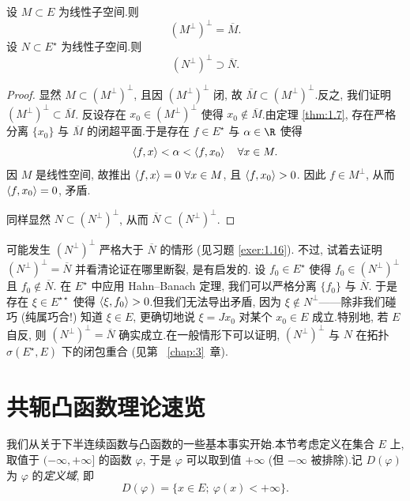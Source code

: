\begin{proposition}
\label{prop:1.9}
设 $M\subset E$ 为线性子空间.则
\begin{equation*}
(M^\perp)^\perp=\overline{M}.
\end{equation*}
设 $N\subset E^\star$ 为线性子空间.则
\begin{equation*}
(N^\perp)^\perp\supset\overline{N}.
\end{equation*}
\end{proposition}

\begin{proof}
显然 $M\subset(M^\perp)^\perp$, 且因 $(M^\perp)^\perp$ 闭, 故
$\overline{M}\subset(M^\perp)^\perp$.反之, 我们证明 $(M^\perp)^\perp\subset\overline{M}$.
反设存在 $x_0\in(M^\perp)^\perp$ 使得 $x_0\notin\overline{M}$.由定理  \ref{thm:1.7},
存在严格分离 $\{x_0\}$ 与 $\overline{M}$ 的闭超平面.于是存在 $f\in E^\star$ 与
$\alpha\in\R$ 使得
\begin{equation*}
\left\langle f,x\right\rangle<\alpha<\left\langle f,x_0\right\rangle\quad \forall x\in M.
\end{equation*}
因 $M$ 是线性空间, 故推出 $\left\langle f,x\right\rangle=0\ \forall x\in M$, 且 $\left\langle f,x_0\right\rangle>0$.
因此 $f\in M^\perp$, 从而 $\left\langle f,x_0\right\rangle=0$, 矛盾.

同样显然 $N\subset(N^\perp)^\perp$, 从而 $\overline{N}\subset(N^\perp)^\perp$.
\end{proof}

\begin{remark}
\label{rem:1.6}
可能发生 $(N^\perp)^\perp$ 严格大于 $\overline{N}$ 的情形 (见习题  \ref{exer:1.16}).
不过, 试着去证明 $(N^\perp)^\perp=\overline{N}$ 并看清论证在哪里断裂, 是有启发的.
设 $f_0\in E^\star$ 使得 $f_0\in(N^\perp)^\perp$ 且 $f_0\notin\overline{N}$.
在 $E^\star$ 中应用 Hahn--Banach 定理, 我们可以严格分离 $\{f_0\}$ 与 $\overline{N}$.
于是存在 $\xi\in E^{\star\star}$ 使得 $\left\langle \xi,f_0\right\rangle>0$.但我们无法导出矛盾, 因为
$\xi\notin N^\perp$——除非我们碰巧 (纯属巧合!) 知道 $\xi\in E$, 更确切地说
$\xi=Jx_0$ 对某个 $x_0\in E$ 成立.特别地, 若 $E$ 自反, 则 $(N^\perp)^\perp=\overline{N}$
确实成立.在一般情形下可以证明, $(N^\perp)^\perp$ 与 $N$ 在\wstar{}拓扑
$\sigma(E^\star,E)$ 下的闭包重合 (见第~
\ref{chap:3}~章).
\end{remark}

\section{共轭凸函数理论速览}
\label{sec:1.4}

我们从关于下半连续函数与凸函数的一些基本事实开始.本节考虑定义在集合 $E$ 上, 取值于 $(-\infty,+\infty]$ 的函数 $\varphi$, 于是 $\varphi$ 可以取到值 $+\infty$
(但 $-\infty$ 被排除).记 $D(\varphi)$ 为 $\varphi$ 的\emph{定义域}, 即
\begin{equation*}
D(\varphi)=\{x\in E;\ \varphi(x)<+\infty\}.
\end{equation*}

